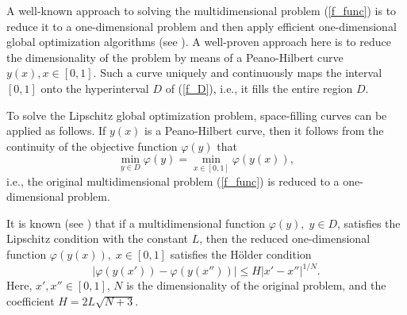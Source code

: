 \documentclass[iicol]{sn-jnl}
\theoremstyle{thmstyleone}%
\theoremstyle{thmstyletwo}%
\theoremstyle{thmstylethree}%
\begin{document}
A well-known approach to solving the multidimensional problem (\ref{f_func}) is to reduce it to a one-dimensional problem and then apply efficient one-dimensional global optimization algorithms (see \citet{Strongin2000,Sergeyev2013}). A well-proven approach here is to reduce the dimensionality of the problem by means of a Peano-Hilbert curve $y(x), x \in [0, 1]$.  Such a curve uniquely and continuously maps the interval $[0, 1]$ onto the hyperinterval $D$ of (\ref{f_D}), i.e., it fills the entire region $D$.

To solve the Lipschitz global optimization problem, space-filling curves can be applied as follows. If $y(x)$ is a Peano-Hilbert curve, then it follows from the continuity of the objective function $\varphi(y)$ that
\[
\min_{y \in D } \varphi(y) = \min_{x \in [0,1] } \varphi(y(x)),
\]
i.e., the original multidimensional problem (\ref{f_func}) is reduced to a one-dimensional problem.

It is known (see \citet{Strongin2000}) that if a multidimensional function  $\varphi(y), \; y \in D$,  satisfies the Lipschitz condition with the constant $L$, then the reduced one-dimensional function $\varphi(y(x)), \; x \in [0,1]$ satisfies the H{\"o}lder condition
\begin{equation}\label{holder}
\left|\varphi(y(x'))-\varphi(y(x''))\right|\leq H\left|x'-x''\right|^{1/N}.
\end{equation}
Here, $x',x''\in[0,1]$, $N$ is the dimensionality of the original problem, and the coefficient
$ H=2 L \sqrt{N+3}$.
\end{document}
